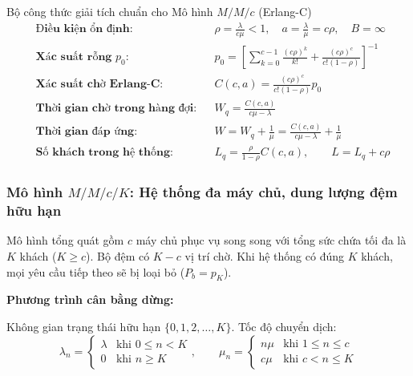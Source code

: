 \begin{modelbox}{Bộ công thức giải tích chuẩn cho Mô hình $M/M/c$ (Erlang-C)}
\begin{align*}
    &\textbf{Điều kiện ổn định:} && \rho = \frac{\lambda}{c\mu} < 1, \quad a = \frac{\lambda}{\mu} = c\rho, \quad B = \infty \\[4pt]
    &\textbf{Xác suất rỗng } p_0\textbf{:} && p_0 = \left[ \sum_{k=0}^{c-1} \frac{(c\rho)^k}{k!} + \frac{(c\rho)^c}{c!(1 - \rho)} \right]^{-1} \\[4pt]
    &\textbf{Xác suất chờ Erlang-C:} && C(c, a) = \frac{(c\rho)^c}{c!(1 - \rho)} p_0 \\[4pt]
    &\textbf{Thời gian chờ trong hàng đợi:} && W_q = \frac{C(c, a)}{c\mu - \lambda} \\[4pt]
    &\textbf{Thời gian đáp ứng:} && W = W_q + \frac{1}{\mu} = \frac{C(c, a)}{c\mu - \lambda} + \frac{1}{\mu} \\[4pt]
    &\textbf{Số khách trong hệ thống:} && L_q = \frac{\rho}{1 - \rho} C(c, a), \qquad L = L_q + c\rho
\end{align*}
\end{modelbox}

\newpage
\subsubsection{Mô hình \texorpdfstring{$M/M/c/K$}{M/M/c/K}: Hệ thống đa máy chủ, dung lượng đệm hữu hạn}

\hspace{0.5cm}Mô hình tổng quát gồm $c$ máy chủ phục vụ song song với tổng sức chứa tối đa là $K$ khách ($K \ge c$). Bộ đệm có $K - c$ vị trí chờ. Khi hệ thống có đúng $K$ khách, mọi yêu cầu tiếp theo sẽ bị loại bỏ ($P_b = p_K$).

\textbf{Phương trình cân bằng dừng:}

Không gian trạng thái hữu hạn $\{0, 1, 2, \dots, K\}$. Tốc độ chuyển dịch:
\begin{equation}
    \lambda_n = \begin{cases} \lambda & \text{khi } 0 \le n < K \\ 0 & \text{khi } n \ge K \end{cases}, \qquad \mu_n = \begin{cases} n\mu & \text{khi } 1 \le n \le c \\ c\mu & \text{khi } c < n \le K \end{cases}
\end{equation}


